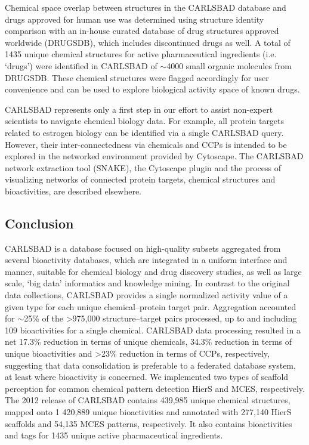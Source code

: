 Chemical space overlap between structures in the CARLSBAD database and drugs approved for human use was determined using structure identity comparison with an in-house curated database of drug structures approved worldwide (DRUGSDB), which includes discontinued drugs as well\cite{Oprea2010-kd,Manallack2013-qm}. A total of 1435 unique chemical structures for active pharmaceutical ingredients (i.e. ‘drugs’) were identified in CARLSBAD of $\sim$4000 small organic molecules from DRUGSDB. These chemical structures were flagged accordingly for user convenience and can be used to explore biological activity space of known drugs.

CARLSBAD represents only a first step in our effort to assist non-expert scientists to navigate chemical biology data. For example, all protein targets related to estrogen biology can be identified via a single CARLSBAD query. However, their inter-connectedness via chemicals and CCPs is intended to be explored in the networked environment provided by Cytoscape\cite{Shannon2003-ph}. The CARLSBAD network extraction tool (SNAKE), the Cytoscape plugin and the process of visualizing networks of connected protein targets, chemical structures and bioactivities, are described elsewhere.

\subsection{Conclusion}

CARLSBAD is a database focused on high-quality subsets aggregated from several bioactivity databases, which are integrated in a uniform interface and manner, suitable for chemical biology and drug discovery studies, as well as large scale, ‘big data’ informatics and knowledge mining. In contrast to the original data collections, CARLSBAD provides a single normalized activity value of a given type for each unique chemical–protein target pair. Aggregation accounted for $\sim$25\% of the \textgreater 975,000 structure–target pairs processed, up to and including 109 bioactivities for a single chemical. CARLSBAD data processing resulted in a net 17.3\% reduction in terms of unique chemicals, 34.3\% reduction in terms of unique bioactivities and \textgreater 23\% reduction in terms of CCPs, respectively, suggesting that data consolidation is preferable to a federated database system, at least where bioactivity is concerned. We implemented two types of scaffold perception for common chemical pattern detection HierS and MCES, respectively. The 2012 release of CARLSBAD contains 439,985 unique chemical structures, mapped onto 1 420,889 unique bioactivities and annotated with 277,140 HierS scaffolds and 54,135 MCES patterns, respectively. It also contains bioactivities and tags for 1435 unique active pharmaceutical ingredients.



